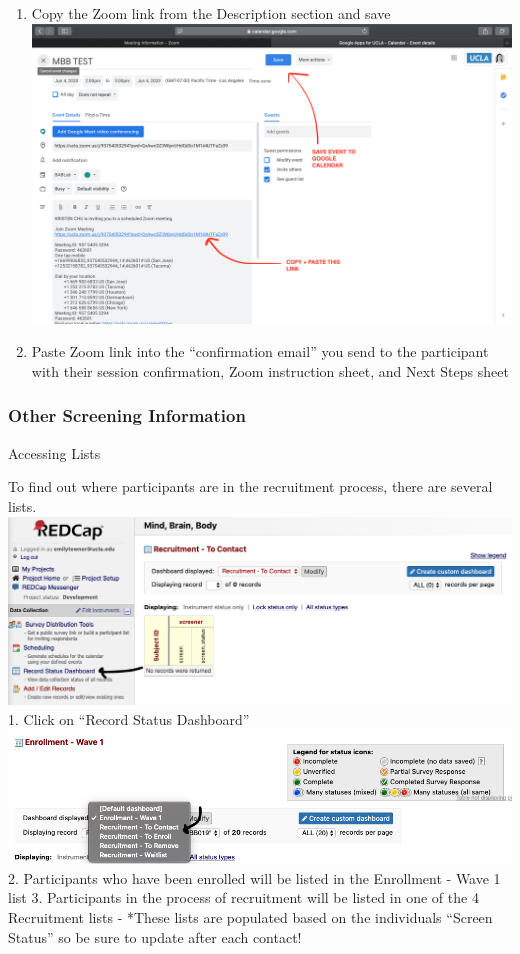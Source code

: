 \documentclass[]{book}
\begin{document}
\begin{enumerate}
\item
  Copy the Zoom link from the Description section and save \includegraphics{images/zoom_link/7.png}
\item
  Paste Zoom link into the ``confirmation email'' you send to the participant with their session confirmation, Zoom instruction sheet, and Next Steps sheet
\end{enumerate}

\hypertarget{other-screening-information}{%
\subsubsection{Other Screening Information}\label{other-screening-information}}

Accessing Lists

To find out where participants are in the recruitment process, there are several lists.
\includegraphics{images/redcap_screening/7.png}
1. Click on ``Record Status Dashboard''
\includegraphics{images/redcap_screening/8.png}
2. Participants who have been enrolled will be listed in the Enrollment - Wave 1 list
3. Participants in the process of recruitment will be listed in one of the 4 Recruitment lists
- *These lists are populated based on the individuals ``Screen Status'' so be sure to update after each contact!
\end{document}
